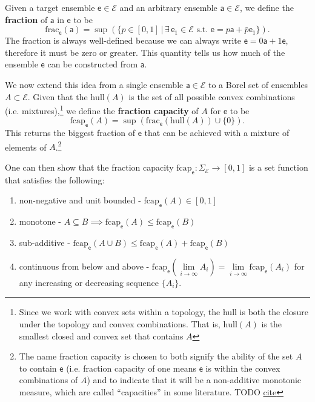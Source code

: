 \documentclass[10pt,twocolumn, nofootinbib]{revtex4-2}
\newcommand\hull{\mathrm{hull}}
\newcommand\fraction{\mathrm{frac}}
\newcommand\frcap{\mathrm{fcap}}
\newcommand{\ens}[1][e] {\mathsf{#1}} %
\newcommand{\Ens}[1][E] {\mathcal{#1}} %
\begin{document}
Given a target ensemble $\ens \in \Ens$ and an arbitrary ensemble $\ens[a] \in \Ens$, we define the \textbf{fraction} of $\ens[a]$ in $\ens$ to be
\begin{equation}
	\fraction_{\ens}(\ens[a]) = \sup(\{ p \in [0,1] \, | \, \exists \, \ens_1 \in \Ens \text{ s.t. }  \ens = p \ens[a] + \bar{p} \ens_1 \}).
\end{equation}
The fraction is always well-defined because we can always write $\ens = 0 \ens[a] + 1 \ens$, therefore it must be zero or greater. This quantity tells us how much of the ensemble $\ens$ can be constructed from $\ens[a]$. 

We now extend this idea from a single ensemble $\ens[a] \in \Ens$ to a Borel set of ensembles $A \subset \Ens$. Given that the $\hull(A)$ is the set of all possible convex combinations (i.e. mixtures),\footnote{Since we work with convex sets within a topology, the hull is both the closure under the topology and convex combinations. That is, $\hull(A)$ is the smallest closed and convex set that contains $A$} we define the \textbf{fraction capacity} of $A$ for $\ens$ to be
\begin{equation}
	\frcap_{\ens}(A) = \sup(\fraction_{\ens}(\hull(A))\cup\{0\}).
\end{equation}
This returns the biggest fraction of $\ens$ that can be achieved with a mixture of elements of $A$.\footnote{The name fraction capacity is chosen to both signify the ability of the set $A$ to contain $\ens$ (i.e. fraction capacity of one means $\ens$ is within the convex combinations of $A$) and to indicate that it will be a non-additive monotonic measure, which are called ``capacities'' in some literature. TODO \href{ https://link.springer.com/book/10.1007/978-3-319-03155-2}{cite} }

One can then show that the fraction capacity $\frcap_{\ens} : \Sigma_{\Ens} \to [0,1]$ is a set function that satisfies the following:
\begin{enumerate}
	\item non-negative and unit bounded - $\frcap_{\ens}(A) \in [0,1]$
	\item monotone - $A \subseteq B \implies \frcap_{\ens}(A) \leq \frcap_{\ens}(B)$
	\item sub-additive - $\frcap_{\ens}(A \cup B) \leq \frcap_{\ens}(A) + \frcap_{\ens}(B)$
	\item continuous from below and above - $\frcap_{\ens}(\lim\limits_{i \to \infty} A_i) = \lim\limits_{i \to \infty} \frcap_{\ens}(A_i)$ for any increasing or decreasing sequence $\{A_i\}$.
\end{enumerate}
\end{document}
